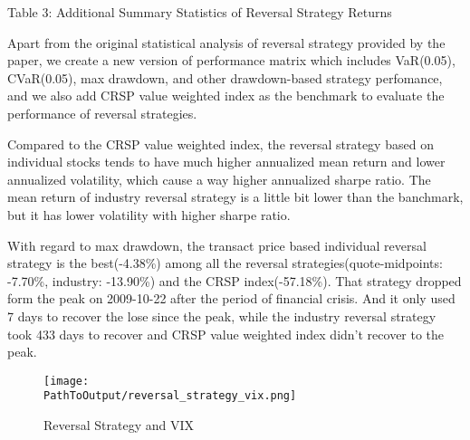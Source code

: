 \documentclass[11pt]{article}
\newcommand*{\PathToOutput}{../output/}
\begin{document}
\begin{landscape}
    \begin{table}
        \centering
        \caption*{Table 3: Additional Summary Statistics of Reversal Strategy Returns}
    
        \raggedright
        
        \small 
        Apart from the original statistical analysis of reversal strategy provided by 
        the paper, we create a new version of performance matrix which includes VaR(0.05), 
        CVaR(0.05), max drawdown, and other drawdown-based strategy perfomance, and we also 
        add CRSP value weighted index as the benchmark to evaluate the performance of reversal strategies. 
    
        Compared to the CRSP value weighted index, the reversal strategy based on individual 
        stocks tends to have much higher annualized mean return and lower annualized volatility, 
        which cause a way higher annualized sharpe ratio. The mean return of industry reversal 
        strategy is a little bit lower than the banchmark, but it has lower volatility 
        with higher sharpe ratio.
    
        With regard to max drawdown, the transact price based individual reversal strategy 
        is the best(-4.38\%) among all the reversal strategies(quote-midpoints: -7.70\%, 
        industry: -13.90\%) and the CRSP index(-57.18\%). That strategy dropped form the 
        peak on 2009-10-22 after the period of financial crisis. And it only used 7 days to 
        recover the lose since the peak, while the industry reversal strategy took 433 days 
        to recover and CRSP value weighted index didn't recover to the peak.
        \medskip
    
        \centering
        
    \end{table}
    
    
    
    \begin{figure}
        \centering
        \texttt{[image: \\PathToOutput/reversal\_strategy\_vix.png]}
        \caption{Reversal Strategy and VIX}
    
        \raggedright
        

\end{figure}
\end{landscape}
\end{document}
